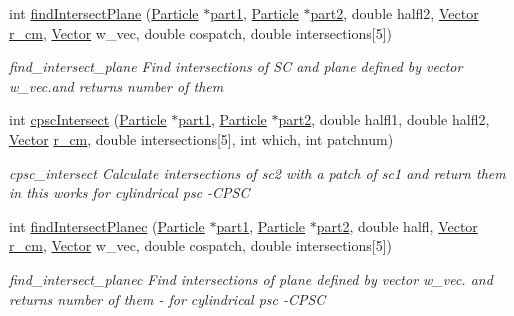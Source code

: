 \begin{DoxyCompactItemize}
int \hyperlink{class_pair_energy_calculator_a983559afda940ae37287610c93696303}{find\+Intersect\+Plane} (\hyperlink{class_particle}{Particle} $\ast$\hyperlink{class_pair_energy_calculator_a168122b4b21b48d25093a9e314045929}{part1}, \hyperlink{class_particle}{Particle} $\ast$\hyperlink{class_pair_energy_calculator_a5930e66e7a0e9c3b2bd7e76391854ad2}{part2}, double halfl2, \hyperlink{class_vector}{Vector} \hyperlink{class_pair_energy_calculator_aa927503ba2066bfcd0fb072e0b7e12cc}{r\+\_\+cm}, \hyperlink{class_vector}{Vector} w\+\_\+vec, double cospatch, double intersections\mbox{[}5\mbox{]})
\begin{DoxyCompactList}\small\item\em find\+\_\+intersect\+\_\+plane Find intersections of S\+C and plane defined by vector w\+\_\+vec.\+and returns number of them \end{DoxyCompactList}\item 
int \hyperlink{class_pair_energy_calculator_a30f17d5f46f78d38fde8090c7751e1d4}{cpsc\+Intersect} (\hyperlink{class_particle}{Particle} $\ast$\hyperlink{class_pair_energy_calculator_a168122b4b21b48d25093a9e314045929}{part1}, \hyperlink{class_particle}{Particle} $\ast$\hyperlink{class_pair_energy_calculator_a5930e66e7a0e9c3b2bd7e76391854ad2}{part2}, double halfl1, double halfl2, \hyperlink{class_vector}{Vector} \hyperlink{class_pair_energy_calculator_aa927503ba2066bfcd0fb072e0b7e12cc}{r\+\_\+cm}, double intersections\mbox{[}5\mbox{]}, int which, int patchnum)
\begin{DoxyCompactList}\small\item\em cpsc\+\_\+intersect Calculate intersections of sc2 with a patch of sc1 and return them in this works for cylindrical psc -\/\+C\+P\+S\+C \end{DoxyCompactList}\item 
int \hyperlink{class_pair_energy_calculator_a2c1bae9f00d84d25717fc3aba6808221}{find\+Intersect\+Planec} (\hyperlink{class_particle}{Particle} $\ast$\hyperlink{class_pair_energy_calculator_a168122b4b21b48d25093a9e314045929}{part1}, \hyperlink{class_particle}{Particle} $\ast$\hyperlink{class_pair_energy_calculator_a5930e66e7a0e9c3b2bd7e76391854ad2}{part2}, double halfl, \hyperlink{class_vector}{Vector} \hyperlink{class_pair_energy_calculator_aa927503ba2066bfcd0fb072e0b7e12cc}{r\+\_\+cm}, \hyperlink{class_vector}{Vector} w\+\_\+vec, double cospatch, double intersections\mbox{[}5\mbox{]})
\begin{DoxyCompactList}\small\item\em find\+\_\+intersect\+\_\+planec Find intersections of plane defined by vector w\+\_\+vec. and returns number of them -\/ for cylindrical psc -\/\+C\+P\+S\+C \end{DoxyCompactList}\item 

\end{DoxyCompactItemize}
